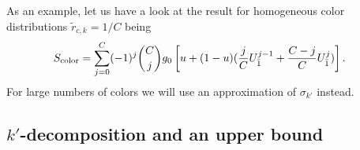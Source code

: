 \documentclass[aps, pre, onecolumn, a4paper, floatfix]{revtex4}
\begin{document}
As an example, let us have a look at the result 
for homogeneous color distributions $\tilde{r}_{c,k}=1/C$ being
\begin{align}
S_{\rm color} &=  \sum_{j=0}^C (-1)^j {C \choose j} g_0\left[u+(1-u)(\frac{j}{C}U_{\bar 1}^{j-1} + \frac{C-j}{C}U_{\bar 1}^{j})\right].
\end{align}
For large numbers of colors we will use an approximation of $\sigma_{k'}$ instead. 





\subsection{$k'$-decomposition and an upper bound}
\end{document}
